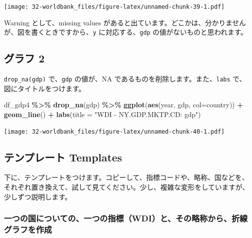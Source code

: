 \documentclass[
  xelatex, ja=standard]{bxjsbook}
\newenvironment{Shaded}{\begin{snugshade}}{\end{snugshade}}
\newcommand{\AttributeTok}[1]{\textcolor[rgb]{0.13,0.29,0.53}{#1}}
\newcommand{\FunctionTok}[1]{\textcolor[rgb]{0.13,0.29,0.53}{\textbf{#1}}}
\newcommand{\NormalTok}[1]{#1}
\newcommand{\SpecialCharTok}[1]{\textcolor[rgb]{0.81,0.36,0.00}{\textbf{#1}}}
\newcommand{\StringTok}[1]{\textcolor[rgb]{0.31,0.60,0.02}{#1}}
\theoremstyle{definition}
\theoremstyle{definition}
\theoremstyle{definition}
\theoremstyle{definition}
\theoremstyle{remark}
\begin{document}
\texttt{[image: 32-worldbank\_files/figure-latex/unnamed-chunk-39-1.pdf]}

Warning として、missing values があると出ています。どこかは、分かりませんが、図を書くときですから、\texttt{y} に対応する、\texttt{gdp} の値がないものと思われます。

\hypertarget{ux30b0ux30e9ux30d5-2}{%
\subsection{グラフ 2}\label{ux30b0ux30e9ux30d5-2}}

\texttt{drop\_na(gdp)} で、\texttt{gdp} の値が、NA であるものを削除します。また、\texttt{labs} で、図にタイトルをつけます。

\begin{Shaded}
\begin{Highlighting}[]
\NormalTok{df\_gdp4 }\SpecialCharTok{\%\textgreater{}\%} \FunctionTok{drop\_na}\NormalTok{(gdp) }\SpecialCharTok{\%\textgreater{}\%} 
  \FunctionTok{ggplot}\NormalTok{(}\FunctionTok{aes}\NormalTok{(year, gdp, }\AttributeTok{col=}\NormalTok{country)) }\SpecialCharTok{+} \FunctionTok{geom\_line}\NormalTok{() }\SpecialCharTok{+}
  \FunctionTok{labs}\NormalTok{(}\AttributeTok{title =} \StringTok{"WDI {-} NY.GDP.MKTP.CD: gdp"}\NormalTok{)}
\end{Highlighting}
\end{Shaded}

\texttt{[image: 32-worldbank\_files/figure-latex/unnamed-chunk-40-1.pdf]}

\hypertarget{ux30c6ux30f3ux30d7ux30ecux30fcux30c8-templates}{%
\subsection{テンプレート Templates}\label{ux30c6ux30f3ux30d7ux30ecux30fcux30c8-templates}}

下に、テンプレートをつけます。コピーして、指標コードや、略称、国などを、それぞれ置き換えて、試して見てください。少し、複雑な変形をしていますが、少しずつ説明します。

\hypertarget{ux4e00ux3064ux306eux56fdux306bux3064ux3044ux3066ux306eux4e00ux3064ux306eux6307ux6a19wdiux3068ux305dux306eux7565ux79f0ux304bux3089ux6298ux7ddaux30b0ux30e9ux30d5ux3092ux4f5cux6210}{%
\subsubsection{一つの国についての、一つの指標（WDI）と、その略称から、折線グラフを作成}\label{ux4e00ux3064ux306eux56fdux306bux3064ux3044ux3066ux306eux4e00ux3064ux306eux6307ux6a19wdiux3068ux305dux306eux7565ux79f0ux304bux3089ux6298ux7ddaux30b0ux30e9ux30d5ux3092ux4f5cux6210}}
\end{document}
